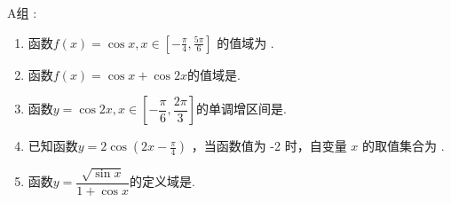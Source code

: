 A组 :
\begin{enumerate}
    \item 函数$f(x)=\cos x, x \in[-\frac{\pi}{4}, \frac{5 \pi}{6}]$ 的值域为 .

    \item 函数$f(x)=\cos{x}+\cos{2x}$的值域是\blkda[2]{$[-\dfrac{9}{8},2]$}.

    \item 函数$y=\cos{2x},x\in [-\dfrac{\pi}{6},\dfrac{2\pi}{3}]$的单调增区间是.

    \item 已知函数$y = 2\cos (2 x-\frac{\pi}{4})$  ，当函数值为 -2 时，自变量 $x$ 的取值集合为 .

    \item 函数$y=\dfrac{\sqrt{\sin{x}}}{1+\cos{x}}$的定义域是\blkda[4]{$[2k\pi,2k\pi+\pi)(k\zz)$}. 
\end{enumerate}

